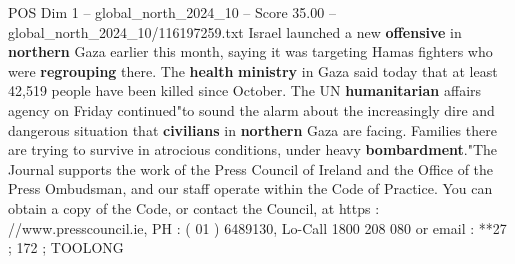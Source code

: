 \begin{textsample}{POS Dim 1 – global\_north\_2024\_10 – Score 35.00 – global\_north\_2024\_10/116197259.txt}
Israel launched a new \textbf{offensive} in \textbf{northern} Gaza earlier this month, saying it was targeting Hamas fighters who were \textbf{regrouping} there.
The \textbf{health} \textbf{ministry} in Gaza said today that at least 42,519 people have been killed since October.
The UN \textbf{humanitarian} affairs agency on Friday continued"to sound the alarm about the increasingly dire and dangerous situation that \textbf{civilians} in \textbf{northern} Gaza are facing.
Families there are trying to survive in atrocious conditions, under heavy \textbf{bombardment}."The Journal supports the work of the Press Council of Ireland and the Office of the Press Ombudsman, and our staff operate within the Code of Practice.
You can obtain a copy of the Code, or contact the Council, at https : //www.presscouncil.ie, PH : ( 01 ) 6489130, Lo-Call 1800 208 080 or email : **27 ; 172 ; TOOLONG

\end{textsample}

